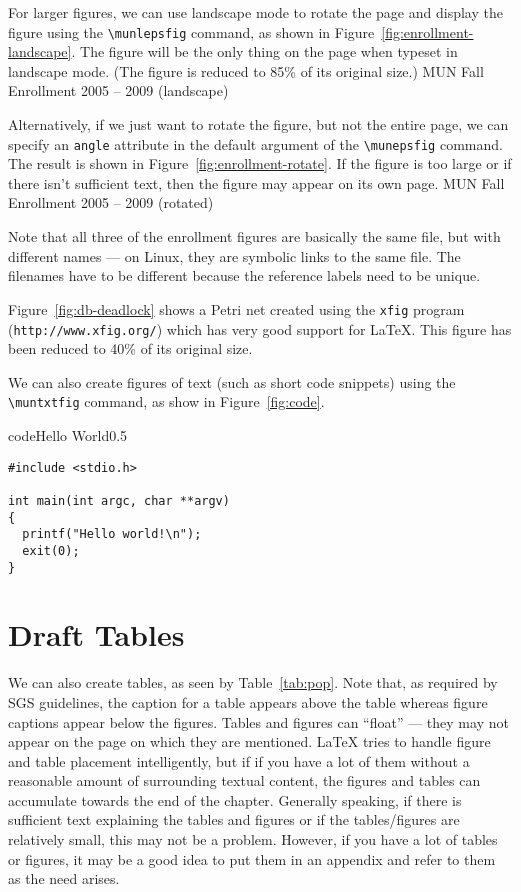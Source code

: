 For larger figures, we can use landscape mode to rotate the page
and display the figure using the \verb+\munlepsfig+ command, as shown
in Figure~\ref{fig:enrollment-landscape}.  The figure will be the
only thing on the page when typeset in landscape mode.
(The figure is reduced to 85\% of its original size.)
	{MUN Fall Enrollment 2005 -- 2009 (landscape)}

Alternatively, if we just want to rotate the figure, but not
the entire page, we can specify an \texttt{angle} attribute
in the default argument of the \verb+\munepsfig+ command.
The result is shown in Figure~\ref{fig:enrollment-rotate}.
If the figure is too large or if there isn't sufficient
text, then the figure may appear on its own page.
	{MUN Fall Enrollment 2005 -- 2009 (rotated)}

Note that all three of the enrollment figures are basically
the same file, but with different names --- on Linux, they are
symbolic links to the same file.  The filenames have to be different
because the reference labels need to be unique.

Figure~\ref{fig:db-deadlock} shows a Petri net created using the
\texttt{xfig} program (\texttt{http://www.xfig.org/}) which has
very good support for \LaTeX.  This figure has been
reduced to 40\% of its original size.

We can also create figures of text (such as short code snippets)
using the \verb+\muntxtfig+ command, as show in Figure~\ref{fig:code}.
\begin{muntxtfig}[1.0]{code}{Hello World}{0.5\textwidth}
\begin{verbatim}
#include <stdio.h>

int main(int argc, char **argv)
{
  printf("Hello world!\n");
  exit(0);
}
\end{verbatim}
\end{muntxtfig}

\section{Draft Tables}

We can also create tables, as seen by Table~\ref{tab:pop}.  Note that,
as required by SGS guidelines, the caption for a table appears above the
table whereas figure captions appear below the figures.  Tables and
figures can ``float'' --- they may not appear on the page on which they
are mentioned.  \LaTeX{} tries to handle figure and table placement
intelligently, but if if you have a lot of them without a reasonable
amount of surrounding textual content, the figures and tables can
accumulate towards the end of the chapter.  Generally speaking, if
there is sufficient text explaining the tables and figures or if the
tables/figures are relatively small, this may not be a problem.  However,
if you have a lot of tables or figures, it may be a good idea to put
them in an appendix and refer to them as the need arises.

